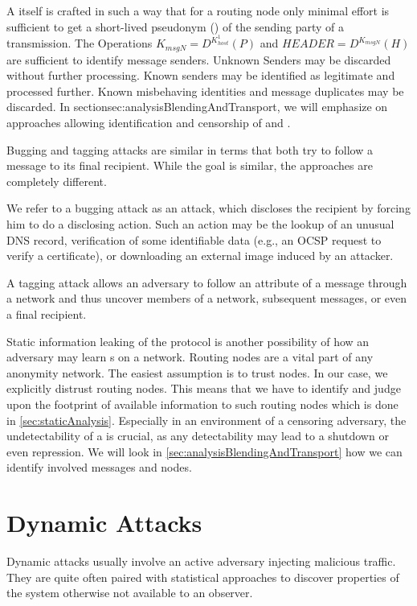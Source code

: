 A \VortexMessage itself is crafted in such a way that for a routing node only minimal effort is sufficient to get a short-lived pseudonym () of the sending party of a transmission. The Operations $ K_{msgN}=D^{K^{1}_{host}}\left(P\right)$ and $HEADER=D^{K_{msgN}}\left(H\right)$ are sufficient to identify message senders. Unknown Senders may be discarded without further processing. Known senders may be identified as legitimate and processed further. Known misbehaving identities and message duplicates may be discarded. In section{sec:analysisBlendingAndTransport}, we will emphasize on approaches allowing identification and censorship of \VortexMessages and \VortexNodes.

Bugging and tagging attacks are similar in terms that both try to follow a message to its final recipient. While the goal is similar, the approaches are completely different.

We refer to a bugging attack as an attack, which discloses the recipient by forcing him to do a disclosing action. Such an action may be the lookup of an unusual DNS record, verification of some identifiable data (e.g., an OCSP request to verify a certificate), or downloading an external image induced by an attacker.

A tagging attack allows an adversary to follow an attribute of a message through a network and thus uncover members of a network, subsequent messages, or even a final recipient.

Static information leaking of the protocol is another possibility of how an adversary may learn s on a network. Routing nodes are a vital part of any anonymity network. The easiest assumption is to trust nodes. In our case, we explicitly distrust routing nodes. This means that we have to identify and judge upon the footprint of available information to such routing nodes which is done in \cref{sec:staticAnalysis}. Especially in an environment of a censoring adversary, the undetectability of a \VortexNode{} is crucial, as any detectability may lead to a shutdown or even repression. We will look in \cref{sec:analysisBlendingAndTransport} how we can identify involved messages and nodes.

\section{Dynamic Attacks}
Dynamic attacks usually involve an active adversary injecting malicious traffic. They are quite often paired with statistical approaches to discover properties of the system otherwise not available to an observer. 

